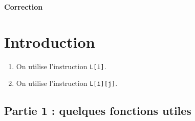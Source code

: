 \documentclass[a4paper,twoside,french,10pt]{VcCours}
\begin{document}

\begin{center}
\large\bf
Correction
\end{center}
\separationTitre


\section*{Introduction}

\begin{enumerate}
\item On utilise l'instruction {\tt L[i]}.
\item On utilise l'instruction {\tt L[i][j]}.
\end{enumerate}

\medskip

\begin{center}
 \subsection*{Partie 1 : quelques fonctions utiles}
\end{center}
\end{document}
